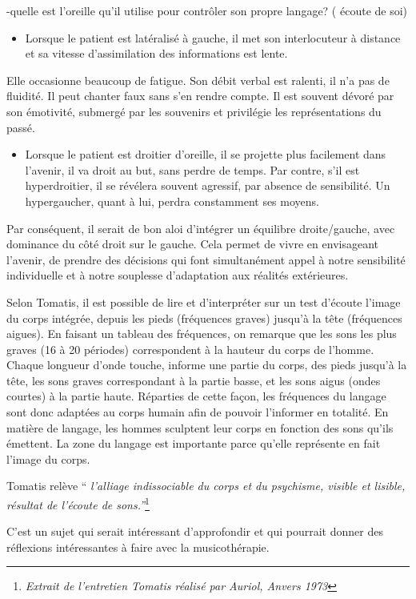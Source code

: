 -quelle est l'oreille qu'il utilise pour contrôler son propre langage?
( écoute de soi)
\begin{itemize}
\item Lorsque le patient est latéralisé à gauche, il met son interlocuteur
à distance et sa vitesse d'assimilation des informations est lente.
\end{itemize}
Elle occasionne beaucoup de fatigue. Son débit verbal est ralenti,
il n'a pas de fluidité. Il peut chanter faux sans s'en rendre compte.
Il est souvent dévoré par son émotivité, submergé par les souvenirs
et privilégie les représentations du passé.
\begin{itemize}
\item Lorsque le patient est droitier d'oreille, il se projette plus facilement
dans l'avenir, il va droit au but, sans perdre de temps. Par contre,
s'il est hyperdroitier, il se révélera souvent agressif, par absence
de sensibilité. Un hypergaucher, quant à lui, perdra constamment ses
moyens.
\end{itemize}
Par conséquent, il serait de bon aloi d'intégrer un équilibre droite/gauche,
avec dominance du côté droit sur le gauche. Cela permet de vivre en
envisageant l'avenir, de prendre des décisions qui font simultanément
appel à notre sensibilité individuelle et à notre souplesse d'adaptation
aux réalités extérieures.

Selon Tomatis, il est possible de lire et d'interpréter sur un test
d'écoute l'image du corps intégrée, depuis les pieds (fréquences graves)
jusqu'à la tête (fréquences aigues). En faisant un tableau des fréquences,
on remarque que les sons les plus graves (16 à 20 périodes) correspondent
à la hauteur du corps de l'homme. Chaque longueur d'onde touche, informe
une partie du corps, des pieds jusqu'à la tête, les sons graves correspondant
à la partie basse, et les sons aigus (ondes courtes) à la partie haute.
Réparties de cette façon, les fréquences du langage sont donc adaptées
au corps humain afin de pouvoir l'informer en totalité. En matière
de langage, les hommes sculptent leur corps en fonction des sons qu'ils
émettent. La zone du langage est importante parce qu'elle représente
en fait l'image du corps.

Tomatis relève ``\emph{ l'alliage indissociable du corps et du psychisme,
visible et lisible, résultat de l'écoute de sons.''}\footnote{\emph{Extrait de l'entretien Tomatis réalisé par Auriol, Anvers 1973}}

C'est un sujet qui serait intéressant d'approfondir et qui pourrait
donner des réflexions intéressantes à faire avec la musicothérapie.
